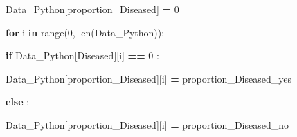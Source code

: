 \documentclass[
  11pt,
  a4paper,
]{article}
\newenvironment{Shaded}{\begin{snugshade}}{\end{snugshade}}
\newcommand{\BuiltInTok}[1]{#1}
\newcommand{\ControlFlowTok}[1]{\textcolor[rgb]{0.13,0.29,0.53}{\textbf{#1}}}
\newcommand{\DecValTok}[1]{\textcolor[rgb]{0.00,0.00,0.81}{#1}}
\newcommand{\KeywordTok}[1]{\textcolor[rgb]{0.13,0.29,0.53}{\textbf{#1}}}
\newcommand{\NormalTok}[1]{#1}
\newcommand{\OperatorTok}[1]{\textcolor[rgb]{0.81,0.36,0.00}{\textbf{#1}}}
\newcommand{\StringTok}[1]{\textcolor[rgb]{0.31,0.60,0.02}{#1}}
\begin{document}
\begin{Shaded}
\begin{Highlighting}[]
\NormalTok{Data\_Python[}\StringTok{\textquotesingle{}proportion\_Diseased\textquotesingle{}}\NormalTok{] }\OperatorTok{=} \DecValTok{0}


\ControlFlowTok{for}\NormalTok{ i }\KeywordTok{in} \BuiltInTok{range}\NormalTok{(}\DecValTok{0}\NormalTok{, }\BuiltInTok{len}\NormalTok{(Data\_Python)):}

    \ControlFlowTok{if}\NormalTok{ Data\_Python[}\StringTok{\textquotesingle{}Diseased\textquotesingle{}}\NormalTok{][i] }\OperatorTok{==} \DecValTok{0}\NormalTok{ :}

\NormalTok{        Data\_Python[}\StringTok{\textquotesingle{}proportion\_Diseased\textquotesingle{}}\NormalTok{][i] }\OperatorTok{=}\NormalTok{ proportion\_Diseased\_yes}

    \ControlFlowTok{else}\NormalTok{ :}

\NormalTok{        Data\_Python[}\StringTok{\textquotesingle{}proportion\_Diseased\textquotesingle{}}\NormalTok{][i] }\OperatorTok{=}\NormalTok{ proportion\_Diseased\_no}
\end{Highlighting}
\end{Shaded}
\end{document}
